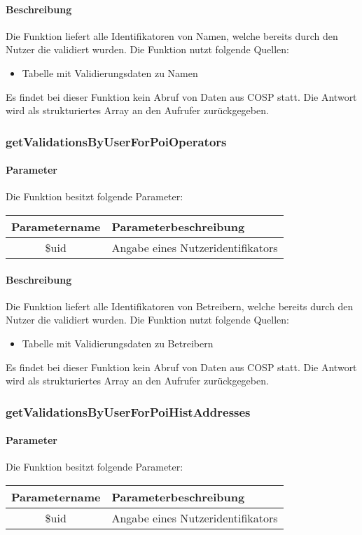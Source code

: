\paragraph{Beschreibung} Die Funktion liefert alle Identifikatoren von Namen, welche bereits durch den Nutzer die validiert wurden. Die Funktion nutzt folgende Quellen:
\begin{itemize}
	\item Tabelle mit Validierungsdaten zu Namen
\end{itemize}
Es findet bei dieser Funktion kein Abruf von Daten aus {\glqq COSP\grqq} statt. Die Antwort wird als strukturiertes Array an den Aufrufer zurückgegeben.
\subsubsection{getValidationsByUserForPoiOperators}
\paragraph{Parameter} Die Funktion besitzt folgende Parameter:
\begin{table}[H]
	\begin{tabular}{|c|p{11cm}|}
		\hline
		\textbf{Parametername} & \textbf{Parameterbeschreibung} \\ \hline
		\$uid & Angabe eines Nutzeridentifikators \\ \hline
	\end{tabular}
\end{table}
\paragraph{Beschreibung} Die Funktion liefert alle Identifikatoren von Betreibern, welche bereits durch den Nutzer die validiert wurden. Die Funktion nutzt folgende Quellen:
\begin{itemize}
	\item Tabelle mit Validierungsdaten zu Betreibern
\end{itemize}
Es findet bei dieser Funktion kein Abruf von Daten aus {\glqq COSP\grqq} statt. Die Antwort wird als strukturiertes Array an den Aufrufer zurückgegeben.
\subsubsection{getValidationsByUserForPoiHistAddresses}
\paragraph{Parameter} Die Funktion besitzt folgende Parameter:
\begin{table}[H]
	\begin{tabular}{|c|p{11cm}|}
		\hline
		\textbf{Parametername} & \textbf{Parameterbeschreibung} \\ \hline
		\$uid & Angabe eines Nutzeridentifikators \\ \hline
	\end{tabular}
\end{table}
